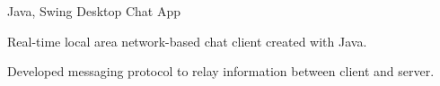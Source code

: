 

\begin{cventries}

  \cventry
  {Java, Swing} %
  {Desktop Chat App} %
  {} %
  {} %
  {
    \begin{cvitems}
      \item {Real-time local area network-based chat client created with Java.}
      \item {Developed messaging protocol to relay information between client and server.}
    \end{cvitems}
  }

\end{cventries}
